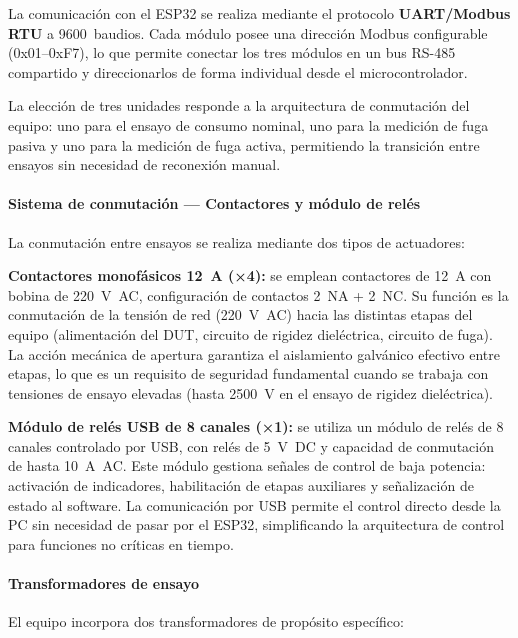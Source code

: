 La comunicación con el ESP32 se realiza mediante el protocolo
\textbf{UART/Modbus RTU} a 9600~baudios.
Cada módulo posee una dirección Modbus configurable (0x01--0xF7),
lo que permite conectar los tres módulos en un bus RS-485 compartido
y direccionarlos de forma individual desde el microcontrolador.

La elección de tres unidades responde a la arquitectura de conmutación
del equipo: uno para el ensayo de consumo nominal,
uno para la medición de fuga pasiva
y uno para la medición de fuga activa,
permitiendo la transición entre ensayos sin necesidad de reconexión manual.

\paragraph{Sistema de conmutación — Contactores y módulo de relés}

La conmutación entre ensayos se realiza mediante dos tipos de actuadores:

\textbf{Contactores monofásicos 12~A (×4):}
se emplean contactores de 12~A con bobina de 220~V~AC,
configuración de contactos 2~NA + 2~NC.
Su función es la conmutación de la tensión de red (220~V~AC)
hacia las distintas etapas del equipo (alimentación del DUT,
circuito de rigidez dieléctrica, circuito de fuga).
La acción mecánica de apertura garantiza el aislamiento galvánico
efectivo entre etapas, lo que es un requisito de seguridad
fundamental cuando se trabaja con tensiones de ensayo elevadas
(hasta 2500~V en el ensayo de rigidez dieléctrica).

\textbf{Módulo de relés USB de 8 canales (×1):}
se utiliza un módulo de relés de 8 canales controlado por USB,
con relés de 5~V~DC y capacidad de conmutación de hasta 10~A~AC.
Este módulo gestiona señales de control de baja potencia:
activación de indicadores, habilitación de etapas auxiliares
y señalización de estado al software.
La comunicación por USB permite el control directo desde la PC
sin necesidad de pasar por el ESP32, simplificando la arquitectura
de control para funciones no críticas en tiempo.

\paragraph{Transformadores de ensayo}

El equipo incorpora dos transformadores de propósito específico:

